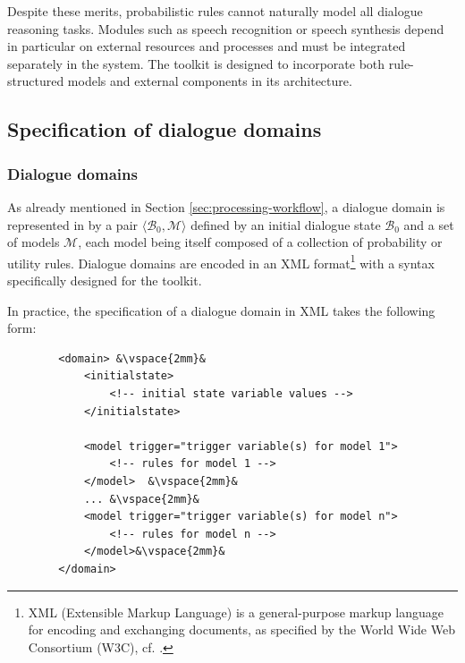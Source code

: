 Despite these merits, probabilistic rules cannot naturally model all dialogue reasoning tasks.  Modules such as speech recognition or speech synthesis depend in particular on external resources and processes and must be integrated separately in the system. The \opendial{} toolkit is designed to incorporate both rule-structured models and external components in its architecture. 
\subsection{Specification of dialogue domains}
\label{sec:domain-specification}

\subsubsection*{Dialogue domains}
As already mentioned in Section \ref{sec:processing-workflow}, a dialogue domain is represented in \opendial{} by a pair $\langle \mathcal{B}_0, \mathcal{M} \rangle$ defined by an initial dialogue state $\mathcal{B}_0$ and a set of models $\mathcal{M}$, each model being itself composed of a collection of probability or utility rules. Dialogue domains are encoded in an XML format\footnote{XML (Extensible Markup Language) is a general-purpose markup language for encoding and exchanging documents, as specified by the World Wide Web Consortium (W3C), cf. .} with a syntax specifically designed for the toolkit. 

In practice, the specification of a dialogue domain in XML takes the following form: \vspace{2mm}
\lstset{language=XML}
\begin{lstlisting}
        <domain> &\vspace{2mm}&
            <initialstate>    
                <!-- initial state variable values -->
            </initialstate>

            <model trigger="trigger variable(s) for model 1">
                <!-- rules for model 1 -->
            </model>  &\vspace{2mm}& 
            ... &\vspace{2mm}&
            <model trigger="trigger variable(s) for model n">
                <!-- rules for model n -->
     	    </model>&\vspace{2mm}&
        </domain>
\end{lstlisting}\vspace{2mm}

